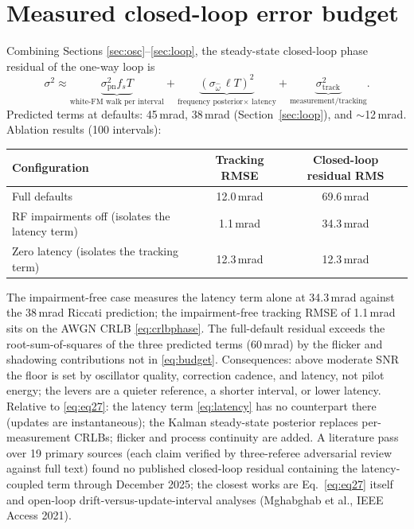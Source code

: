 \documentclass[10pt]{article}
\begin{document}
\section{Measured closed-loop error budget}
\label{sec:budget}
Combining Sections \ref{sec:osc}--\ref{sec:loop}, the steady-state
closed-loop phase residual of the one-way loop is
\begin{equation}
\sigma^2 \approx \underbrace{\sigma_{\mathrm{pn}}^2 f_s T}_{\text{white-FM
walk per interval}}
+\underbrace{(\sigma_{\hat\omega}\,\ell T)^2}_{\text{frequency posterior
$\times$ latency}}
+\underbrace{\sigma^2_{\mathrm{track}}}_{\text{measurement/tracking}} .
\label{eq:budget}
\end{equation}
Predicted terms at defaults: 45\,mrad, 38\,mrad
(Section~\ref{sec:loop}), and $\sim$12\,mrad. Ablation results (100
intervals):
\begin{center}
\begin{tabular}{lcc}
\toprule
Configuration & Tracking RMSE & Closed-loop residual RMS\\
\midrule
Full defaults & 12.0\,mrad & 69.6\,mrad\\
RF impairments off (isolates the latency term) & 1.1\,mrad & 34.3\,mrad\\
Zero latency (isolates the tracking term) & 12.3\,mrad & 12.3\,mrad\\
\bottomrule
\end{tabular}
\end{center}
The impairment-free case measures the latency term alone at 34.3\,mrad
against the 38\,mrad Riccati prediction; the impairment-free tracking
RMSE of 1.1\,mrad sits on the AWGN CRLB \eqref{eq:crlbphase}. The
full-default residual exceeds the root-sum-of-squares of the three
predicted terms (60\,mrad) by the flicker and shadowing contributions not
in \eqref{eq:budget}. Consequences: above moderate SNR the floor is set
by oscillator quality, correction cadence, and latency, not pilot energy;
the levers are a quieter reference, a shorter interval, or lower latency.
Relative to \eqref{eq:eq27}: the latency term \eqref{eq:latency} has no
counterpart there (updates are instantaneous); the Kalman steady-state
posterior replaces per-measurement CRLBs; flicker and process continuity
are added. A literature pass over 19 primary sources (each claim verified
by three-referee adversarial review against full text) found no published
closed-loop residual containing the latency-coupled term through
December 2025; the closest works are Eq.~\eqref{eq:eq27} itself and
open-loop drift-versus-update-interval analyses (Mghabghab et al., IEEE
Access 2021).
\end{document}
